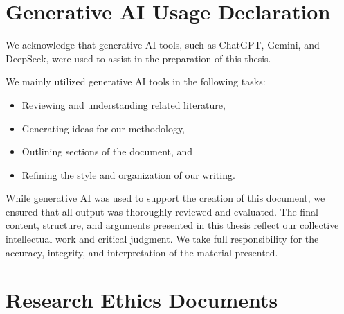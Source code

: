 %
%
%                 
\chapter{Generative AI Usage Declaration}
\label{sec:appendix_genai}

We acknowledge that generative AI tools, such as ChatGPT, Gemini, and DeepSeek, were used to assist in the preparation of this thesis.

We mainly utilized generative AI tools in the following tasks:
\begin{itemize}
	\item Reviewing and understanding related literature,
	\item Generating ideas for our methodology,
	\item Outlining sections of the document, and
	\item Refining the style and organization of our writing.
\end{itemize}

While generative AI was used to support the creation of this document, we ensured that all output was thoroughly reviewed and evaluated. The final content, structure, and arguments presented in this thesis reflect our collective intellectual work and critical judgment. We take full responsibility for the accuracy, integrity, and interpretation of the material presented.

\chapter{Research Ethics Documents}
\label{sec:appendixa}


\begin{comment}

IMPORTANT -- READ THIS PART!!!

Please follow the instructions below on how to include the Research Ethics documents 
in your proposal document (typeset using LaTeX):

1. Open, and accomplish the contents of the THREE Word DOCX files included in the distribution

2. Once you're done filling in the necessary items, save the file in PDF format.  This is done by clicking on "File", 
    then "Save As" and then choose PDF (not DOCX default option) .  Do this for the three documents.

   The filenames are long, so I renamed the files with shorter names: 
       a . clearance.PDF  (original was GradSchool-revised ethics clearance form)
       b. general_checklist.PDF (original was General Research Ethics Checklist)
       c.  checklist-A PDF (original was [Specific Checklists] Checklist A - Human Participants]

\end{comment}


